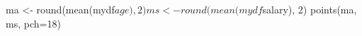 \begin{Schunk}
\begin{Sinput}
 ma <- round(mean(mydf$age), 2)
 ms <- round(mean(mydf$salary), 2)
 points(ma, ms, pch=18)
\end{Sinput}
\end{Schunk}
